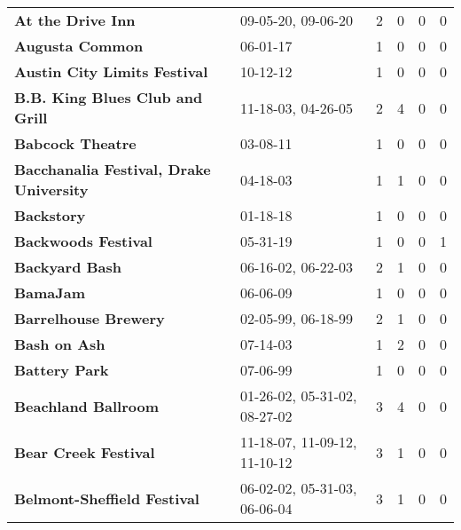 \begin{supertabular}{llllll}
                                            \textbf{At the Drive Inn} &            09-05-20, 09-06-20 &  2 &   0 &  0 &  0 \\
                                              \textbf{Augusta Common} &                      06-01-17 &  1 &   0 &  0 &  0 \\
                                 \textbf{Austin City Limits Festival} &                      10-12-12 &  1 &   0 &  0 &  0 \\
                              \textbf{B.B. King Blues Club and Grill} &            11-18-03, 04-26-05 &  2 &   4 &  0 &  0 \\
                                             \textbf{Babcock Theatre} &                      03-08-11 &  1 &   0 &  0 &  0 \\
                      \textbf{Bacchanalia Festival, Drake University} &                      04-18-03 &  1 &   1 &  0 &  0 \\
                                                   \textbf{Backstory} &                      01-18-18 &  1 &   0 &  0 &  0 \\
                                          \textbf{Backwoods Festival} &                      05-31-19 &  1 &   0 &  0 &  1 \\
                                               \textbf{Backyard Bash} &            06-16-02, 06-22-03 &  2 &   1 &  0 &  0 \\
                                                     \textbf{BamaJam} &                      06-06-09 &  1 &   0 &  0 &  0 \\
                                         \textbf{Barrelhouse Brewery} &            02-05-99, 06-18-99 &  2 &   1 &  0 &  0 \\
                                                 \textbf{Bash on Ash} &                      07-14-03 &  1 &   2 &  0 &  0 \\
                                                \textbf{Battery Park} &                      07-06-99 &  1 &   0 &  0 &  0 \\
                                          \textbf{Beachland Ballroom} &  01-26-02, 05-31-02, 08-27-02 &  3 &   4 &  0 &  0 \\
                                         \textbf{Bear Creek Festival} &  11-18-07, 11-09-12, 11-10-12 &  3 &   1 &  0 &  0 \\
                                  \textbf{Belmont-Sheffield Festival} &  06-02-02, 05-31-03, 06-06-04 &  3 &   1 &  0 &  0 \\

\end{supertabular}
